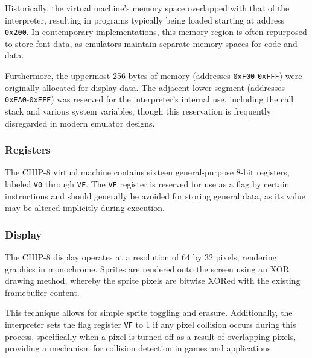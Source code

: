 \par Historically, the virtual machine's memory space overlapped with that of the interpreter, resulting in programs typically being loaded starting at address \texttt{0x200}. In contemporary implementations, this memory region is often repurposed to store font data, as emulators maintain separate memory spaces for code and data.

\par Furthermore, the uppermost 256 bytes of memory (addresses \texttt{0xF00}-\texttt{0xFFF}) were originally allocated for display data. The adjacent lower segment (addresses \texttt{0xEA0}-\texttt{0xEFF}) was reserved for the interpreter's internal use, including the call stack and various system variables, though this reservation is frequently disregarded in modern emulator designs.

\subsubsection{Registers}

\par The CHIP-8 virtual machine contains sixteen general-purpose 8-bit registers, labeled \texttt{V0} through \texttt{VF}. The \texttt{VF} register is reserved for use as a flag by certain instructions and should generally be avoided for storing general data, as its value may be altered implicitly during execution.

\subsubsection{Display}

\par The CHIP-8 display operates at a resolution of 64 by 32 pixels, rendering graphics in monochrome. Sprites are rendered onto the screen using an XOR drawing method, whereby the sprite pixels are bitwise XORed with the existing framebuffer content.

\par This technique allows for simple sprite toggling and erasure. Additionally, the interpreter sets the flag register \texttt{VF} to 1 if any pixel collision occurs during this process, specifically when a pixel is turned off as a result of overlapping pixels, providing a mechanism for collision detection in games and applications.

